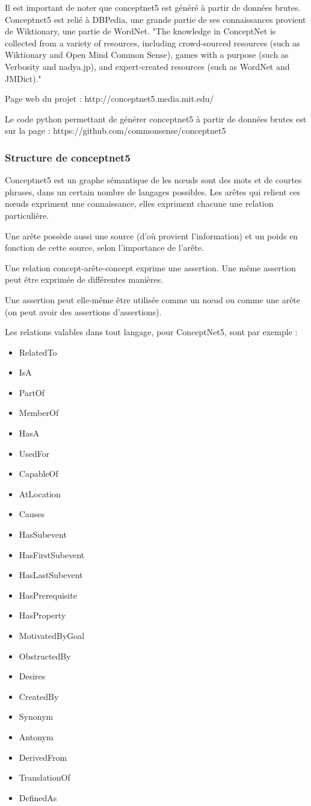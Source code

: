 \documentclass[a4paper,12pt]{article}
\begin{document}
Il est important de noter que conceptnet5 est généré à partir de données brutes. Conceptnet5 est relié à DBPedia, une grande partie de ses connaissances provient de Wiktionary, une partie de WordNet.
"The knowledge in ConceptNet is collected from a variety of resources, including crowd-sourced resources (such as Wiktionary and Open Mind Common Sense), games with a purpose (such as Verbosity and nadya.jp), and expert-created resources (such as WordNet and JMDict)."

Page web du projet :
http://conceptnet5.media.mit.edu/

Le code python permettant de générer conceptnet5 à partir de données brutes est sur la page :
https://github.com/commonsense/conceptnet5

\subsubsection{Structure de conceptnet5}

Conceptnet5 est un graphe sémantique de 
les n\oe uds sont des mots et de courtes phrases, dans un certain nombre de langages possibles. Les arêtes qui relient ces n\oe uds expriment une connaissance, elles expriment chacune une relation particulière.

Une arête possède aussi une source (d'où provient l'information) et un poids en fonction de cette source, selon l'importance de l'arête.

Une relation concept-arête-concept exprime une assertion. Une même assertion peut être exprimée de différentes manières.

Une assertion peut elle-même être utilisée comme un n\oe ud ou comme une arête (on peut avoir des assertions d'assertions).

Les relations valables dans tout langage, pour ConceptNet5, sont par exemple : 
\begin{itemize}
 \item RelatedTo
 \item IsA
 \item PartOf
 \item MemberOf
 \item HasA
 \item UsedFor
 \item CapableOf
 \item AtLocation
 \item Causes
 \item HasSubevent
 \item HasFirstSubevent
 \item HasLastSubevent
 \item HasPrerequisite
 \item HasProperty
 \item MotivatedByGoal
 \item ObstructedBy
 \item Desires
 \item CreatedBy
 \item Synonym
 \item Antonym
 \item DerivedFrom
 \item TranslationOf
 \item DefinedAs
\end{itemize}
\end{document}
